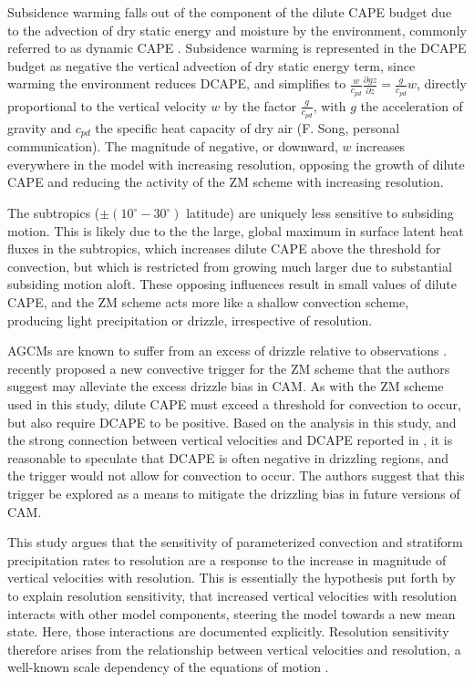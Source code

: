 \documentclass[times]{qjrms4}
\begin{document}
Subsidence warming falls out of the component of the dilute CAPE budget due to the advection of dry static energy and moisture by the environment, commonly referred to as dynamic CAPE \citep[DCAPE;][]{XZ2000JGR,Z2002JGR}. Subsidence warming is represented in the DCAPE budget as negative the vertical advection of dry static energy term, since warming the environment reduces DCAPE, and simplifies to $\frac{w}{c_{pd}} \frac{\partial gz}{\partial z} = \frac{g}{c_{pd}} w$, directly proportional to the vertical velocity $w$ by the factor $\frac{g}{c_{pd}}$, with $g$ the acceleration of gravity and $c_{pd}$ the specific heat capacity of dry air (F. Song, personal communication). The magnitude of negative, or downward, $w$ increases everywhere in the model with increasing resolution, opposing the growth of dilute CAPE and reducing the activity of the ZM scheme with increasing resolution.

The subtropics ($\pm (10^{\circ}-30^{\circ})$ latitude) are uniquely less sensitive to subsiding motion. This is likely due to the the large, global maximum in surface latent heat fluxes in the subtropics, which increases dilute CAPE above the threshold for convection, but which is restricted from growing much larger due to substantial subsiding motion aloft. These opposing influences result in small values of dilute CAPE, and the ZM scheme acts more like a shallow convection scheme, producing light precipitation or drizzle, irrespective of resolution. 

AGCMs are known to suffer from an excess of drizzle relative to observations \citep{D2006JCLIM}. \cite{XETAL2019JAMES} recently proposed a new convective trigger for the ZM scheme that the authors suggest may alleviate the excess drizzle bias in CAM. As with the ZM scheme used in this study, dilute CAPE must exceed a threshold for convection to occur, but \cite{XETAL2019JAMES} also require DCAPE to be positive. Based on the analysis in this study, and the strong connection between vertical velocities and DCAPE reported in \cite{SZ2018JCLIM}, it is reasonable to speculate that DCAPE is often negative in drizzling regions, and the \cite{XETAL2019JAMES} trigger would not allow for convection to occur. The authors suggest that this trigger be explored as a means to mitigate the drizzling bias in future versions of CAM.

This study argues that the sensitivity of parameterized convection and stratiform precipitation rates to resolution are a response to the increase in magnitude of vertical velocities with resolution. This is essentially the hypothesis put forth by \cite{HR2017JCLIM} to explain resolution sensitivity, that increased vertical velocities with resolution interacts with other model components, steering the model towards a new mean state. Here, those interactions are documented explicitly. Resolution sensitivity therefore arises from the relationship between vertical velocities and resolution, a well-known scale dependency of the equations of motion \citep{O1981JAS}.
\end{document}
